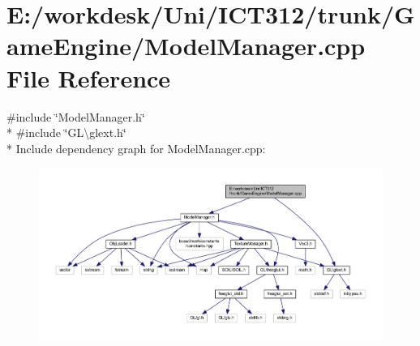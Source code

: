 \section{E\+:/workdesk/\+Uni/\+I\+C\+T312/trunk/\+Game\+Engine/\+Model\+Manager.cpp File Reference}
\label{_model_manager_8cpp}
{\ttfamily \#include \char`\"{}Model\+Manager.\+h\char`\"{}}\\*
{\ttfamily \#include \char`\"{}G\+L\textbackslash{}glext.\+h\char`\"{}}\\*
Include dependency graph for Model\+Manager.\+cpp\+:\nopagebreak
\begin{figure}[H]
\begin{center}
\leavevmode
\includegraphics[width=350pt]{d2/da6/_model_manager_8cpp__incl}
\end{center}
\end{figure}
